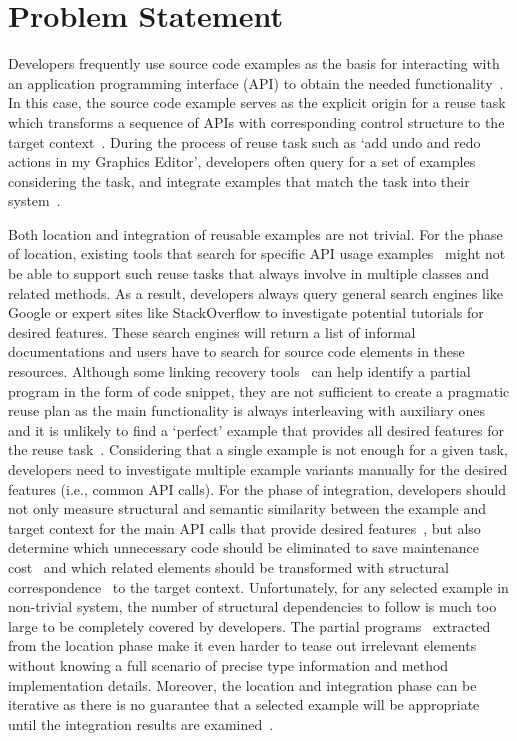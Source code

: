 
\section{Problem Statement}

Developers frequently use source code examples as the basis for interacting with an  application programming interface (API) to obtain the needed functionality~\cite{CodeSearch:FSE15}.  In this case, the source code example serves as the explicit origin for a reuse task which transforms a sequence of APIs with corresponding control structure to the target context~\cite{Frakes:reuseStatus05}.  During the process of reuse task such as `add undo and redo actions in my Graphics Editor', developers often query for a set of examples considering the task, and integrate examples that match the task into their system~\cite{Parsons:cognitiveReuse04}. 

Both location and integration of reusable examples are not trivial. For the phase of location, existing tools that search for specific API usage examples~\cite{MAPO:ECOOP09, Buse:apiICSE12, Export:DenysASE13, Sourcerer:SC14} might not be able to support such reuse tasks that always involve in multiple classes and related methods.  As a result, developers always query general search engines like Google or expert sites like StackOverflow to investigate potential tutorials for desired features. These search engines will return a list of informal documentations and users have to search for source code elements in these resources. Although some linking recovery  tools~\cite{PeterACE:ICSE13, RecoDoc:ICSE12} can help identify a partial program in the form of code snippet, they are not  sufficient to create a pragmatic reuse plan as the main functionality is always interleaving with auxiliary ones and  it is unlikely to find a `perfect' example that provides all desired features for the reuse task~\cite{Holmes:reuseStudy09}. Considering that a single example is not enough for a given task, developers need to investigate multiple example variants manually for the desired features (i.e., common API calls). For the phase of integration, developers should not only  measure structural and semantic similarity between the example and target context for the main API calls that provide desired features~\cite{Cottrell:jigsaw08}, but also determine which unnecessary code should be eliminated to save maintenance cost~\cite{Holmes:ASE09, Holmes:reuse07} and which related elements should be transformed with structural correspondence~\cite{Cottrell:generalize07} to the target context. Unfortunately, for any selected example in non-trivial system, the number of structural dependencies to follow is much too large to be completely covered by developers. The partial programs~\cite{partialProgram:OOPSLA08} extracted from the location phase make it even harder to  tease out irrelevant elements  without knowing a full scenario of precise type information and method implementation details.  Moreover,  the location and integration phase can be iterative as there is no guarantee that a selected example will be appropriate until the integration results are examined~\cite{Holmes:reuseStudy09}. 

